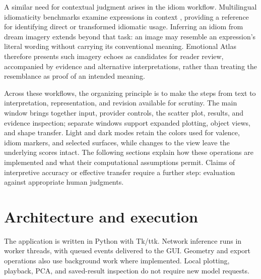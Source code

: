 \documentclass[manuscript,screen,nonacm]{acmart}
\begin{document}
A similar need for contextual judgment arises in the idiom workflow. Multilingual idiomaticity benchmarks examine expressions in context \cite{idioms}, providing a reference for identifying direct or transformed idiomatic usage. Inferring an idiom from dream imagery extends beyond that task: an image may resemble an expression's literal wording without carrying its conventional meaning. Emotional Atlas therefore presents such imagery echoes as candidates for reader review, accompanied by evidence and alternative interpretations, rather than treating the resemblance as proof of an intended meaning.

Across these workflows, the organizing principle is to make the steps from text to interpretation, representation, and revision available for scrutiny. The main window brings together input, provider controls, the scatter plot, results, and evidence inspection; separate windows support expanded plotting, object views, and shape transfer. Light and dark modes retain the colors used for valence, idiom markers, and selected surfaces, while changes to the view leave the underlying scores intact. The following sections explain how these operations are implemented and what their computational assumptions permit. Claims of interpretive accuracy or effective transfer require a further step: evaluation against appropriate human judgments.

\section{Architecture and execution}\label{architecture-and-execution}

The application is written in Python with Tk/ttk. Network inference runs
in worker threads, with queued events delivered to the GUI. Geometry and
export operations also use background work where implemented. Local
plotting, playback, PCA, and saved-result inspection do not require new
model requests.
\end{document}
